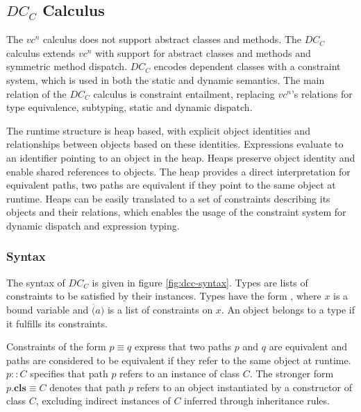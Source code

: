 \subsection{$DC_C$ Calculus}
\label{sec:dcc}
The $vc^n$ calculus does not support abstract classes and methods.
The $DC_C$ calculus\cite{vaidas:thesis} extends $vc^n$ with support for abstract classes and methods
and symmetric method dispatch.
$DC_C$ encodes dependent classes with a constraint system,
which is used in both the static and dynamic semantics.
The main relation of the $DC_C$ calculus is constraint entailment,
replacing $vc^n$'s relations for type equivalence, subtyping, static and dynamic dispatch.

The runtime structure is heap based,
with explicit object identities
and relationships between objects based on these identities.
Expressions evaluate to an identifier pointing to an object in the heap.
Heaps preserve object identity and enable shared references to objects.
The heap provides a direct interpretation for equivalent paths,
two paths are equivalent if they point to the same object at runtime.
Heaps can be easily translated to a set of constraints describing its objects and their relations,
which enables the usage of the constraint system for dynamic dispatch and expression typing.
\subsubsection{Syntax}
The syntax of $DC_C$ is given in figure \ref{fig:dcc-syntax}.
Types are lists of constraints to be satisfied by their instances.
Types have the form , where $x$ is a bound variable
and $\overline(a)$ is a list of constraints on $x$.
An object belongs to a type if it fulfills its constraints.

Constraints of the form $p \equiv q$ express that two paths $p$ and $q$ are equivalent
and paths are considered to be equivalent if they refer to the same object at runtime.
$p :: C$ specifies that path $p$ refers to an instance of class $C$.
The stronger form $p.\textbf{cls} \equiv C$ denotes that
path $p$ refers to an object instantiated by a constructor of class $C$,
excluding indirect instances of $C$ inferred through inheritance rules.

